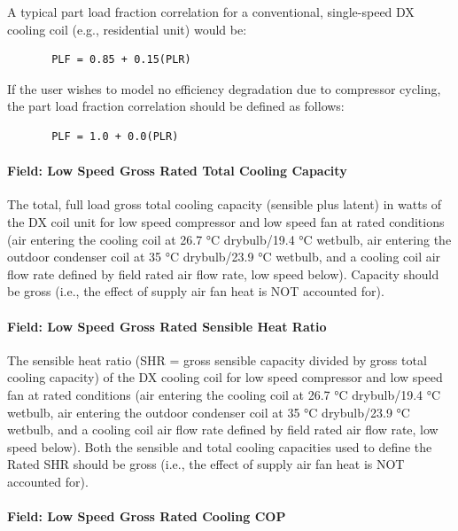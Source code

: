 A typical part load fraction correlation for a conventional, single-speed DX cooling coil (e.g., residential unit) would be:

\begin{lstlisting}
       PLF = 0.85 + 0.15(PLR)
\end{lstlisting}

If the user wishes to model no efficiency degradation due to compressor cycling, the part load fraction correlation should be defined as follows:

\begin{lstlisting}
       PLF = 1.0 + 0.0(PLR)
\end{lstlisting}

\paragraph{Field: Low Speed Gross Rated Total Cooling Capacity}\label{field-low-speed-gross-rated-total-cooling-capacity}

The total, full load gross total cooling capacity (sensible plus latent) in watts of the DX coil unit for low speed compressor and low speed fan at rated conditions (air entering the cooling coil at 26.7 °C drybulb/19.4 °C wetbulb, air entering the outdoor condenser coil at 35 °C drybulb/23.9 °C wetbulb, and a cooling coil air flow rate defined by field rated air flow rate, low speed below). Capacity should be gross (i.e., the effect of supply air fan heat is NOT accounted for).

\paragraph{Field: Low Speed Gross Rated Sensible Heat Ratio}\label{field-low-speed-gross-rated-sensible-heat-ratio}

The sensible heat ratio (SHR = gross sensible capacity divided by gross total cooling capacity) of the DX cooling coil for low speed compressor and low speed fan at rated conditions (air entering the cooling coil at 26.7 °C drybulb/19.4 °C wetbulb, air entering the outdoor condenser coil at 35 °C drybulb/23.9 °C wetbulb, and a cooling coil air flow rate defined by field rated air flow rate, low speed below). Both the sensible and total cooling capacities used to define the Rated SHR should be gross (i.e., the effect of supply air fan heat is NOT accounted for).

\paragraph{Field: Low Speed Gross Rated Cooling COP}\label{field-low-speed-gross-rated-cooling-cop}

